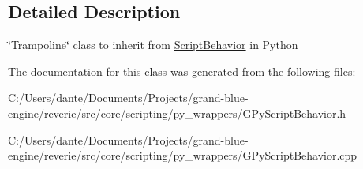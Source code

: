 \subsection{Detailed Description}
\char`\"{}\+Trampoline\char`\"{} class to inherit from \mbox{\hyperlink{classrev_1_1_script_behavior}{Script\+Behavior}} in Python 

The documentation for this class was generated from the following files\+:\begin{DoxyCompactItemize}
\item 
C\+:/\+Users/dante/\+Documents/\+Projects/grand-\/blue-\/engine/reverie/src/core/scripting/py\+\_\+wrappers/G\+Py\+Script\+Behavior.\+h\item 
C\+:/\+Users/dante/\+Documents/\+Projects/grand-\/blue-\/engine/reverie/src/core/scripting/py\+\_\+wrappers/G\+Py\+Script\+Behavior.\+cpp\end{DoxyCompactItemize}
